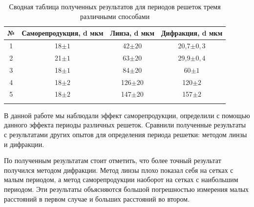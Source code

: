 \documentclass[a4paper, 12pt]{article}%
\begin{document}
\begin{enumerate}
\begin{longtable}{|c|c|c|c|}
			№ & Саморепродукция, d мкм & Линза, d мкм & Дифракция, d мкм \\ \hline
			1 & 18$\pm 1$ & 42$\pm 20$& 20,7$\pm 0,3$\\ \hline
			2 & 21$\pm 1$ & 63$\pm 20$ & 29,9$\pm 0,4$\\ \hline
			3 & 18$\pm 1$ & 84$\pm 20$ & 60$\pm 1$\\ \hline
			4 & 18$\pm 2$ & 126$\pm 20$ & 120$\pm 2$\\ \hline
			5 & 18$\pm 2$ & 147$\pm 20$ & 157$\pm 2$\\ \hline
			\caption{Сводная таблица полученных результатов для периодов решеток тремя различными способами}
		\end{longtable}
		
		В данной работе мы наблюдали эффект саморепродукции, определили с помощью данного эффекта периоды различных решеток. Сравнили полученные результаты с результатами других опытов для определения периода решетки: методом линзы и дифракции.
		
		По полученным результатам стоит отметить, что более точный результат получился методом дифракции. Метод линзы плохо показал себя на сетках с малым периодом, а метод саморепродукции наоборот на сетках с наибольшим периодом. Эти результаты объясняются большой погрешностью измерения малых расстояний в первом случае и больших расстояний во втором.
		
		
		
	\end{enumerate}
	
	
	
	
	
	
	
	
	
	
	
	
	
	
	
	
	
	
	
	
	
	
	
	
	
	
	
	
\end{document}
